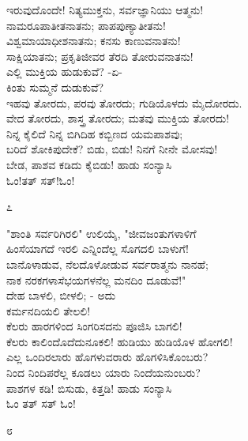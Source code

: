 \begin{myquote}
ಇರುವುದೊಂದೇ! ನಿತ್ಯಮುಕ್ತನು, ಸರ್ವಜ್ಞಾನಿಯು ಆತ್ಮನು!\\ನಾಮರೂಪಾತೀತನಾತನು; ಪಾಪಪುಣ್ಯಾತೀತನು!\\ವಿಶ್ವಮಾಯಾಧೀಶನಾತನು; ಕನಸು ಕಾಣುವನಾತನು!\\ಸಾಕ್ಷಿಯಾತನು; ಪ್ರಕೃತಿಜೀವರ ತೆರದಿ ತೋರುವನಾತನು!\\ಎಲ್ಲಿ ಮುಕ್ತಿಯ ಹುಡುಕುವೆ? -ಏ-\\ಕಿಂತು ಸುಮ್ಮನೆ ದುಡುಕುವೆ?\\ಇಹವು ತೋರದು, ಪರವು ತೋರದು; ಗುಡಿಯೊಳದು ಮೈದೋರದು.\\ವೇದ ತೋರದು, ಶಾಸ್ತ್ರ ತೋರದು; ಮತವು ಮುಕ್ತಿಯ ತೋರದು!\\ನಿನ್ನ ಕೈಲಿದೆ ನಿನ್ನ ಬಿಗಿದಿಹ ಕಬ್ಬಿಣದ ಯಮಪಾಶವು;\\ಬರಿದೆ ಶೋಕಿಪುದೇಕೆ? ಬಿಡು, ಬಿಡು! ನಿನಗೆ ನೀನೇ ಮೋಸವು!\\ಬೇಡ, ಪಾಶವ ಕಡಿದು ಕೈಬಿಡು! ಹಾಡು ಸಂನ್ಯಾಸಿ\\ಓಂ!ತತ್ ಸತ್!ಓಂ!
\end{myquote}

\begin{center}
೭
\end{center}

\begin{myquote}
"ಶಾಂತಿ ಸರ್ವರಿಗಿರಲಿ" ಉಲಿಯೈ, "ಜೀವಜಂತುಗಳಾಳಿಗೆ\\ಹಿಂಸೆಯಾಗದೆ ಇರಲಿ ಎನ್ನಿಂದೆಲ್ಲ ಸೊಗದಲಿ ಬಾಳುಗೆ!\\ಬಾನೊಳಾಡುವ, ನೆಲದೊಳೋಡುವ ಸರ್ವರಾತ್ಮನು ನಾನಹೆ;\\ನಾಕ ನರಕಗಳಾಸೆಭಯಗಳನೆಲ್ಲ ಮನದಿಂ ದೂಡುವೆ!"\\ದೇಹ ಬಾಳಲಿ, ಬೀಳಲಿ; - ಅದು\\ಕರ್ಮನದಿಯಲಿ ತೇಲಲಿ!\\ಕೆಲರು ಹಾರಗಳಿಂದ ಸಿಂಗರಿಸದನು ಪೂಜಿಸಿ ಬಾಗಲಿ!\\ಕೆಲರು ಕಾಲಿಂದೊದೆದುನೂಕಲಿ! ಹುಡಿಯು ಹುಡಿಯೊಳ ಹೋಗಲಿ!\\ಎಲ್ಲ ಒಂದಿರಲಾರು ಹೊಗಳುವರಾರು ಹೊಗಳಿಸಿಕೊಂಬರು?\\ನಿಂದ ನಿಂದಿಪರೆಲ್ಲ ಕೂಡಲು ಯಾರು ನಿಂದೆಯನುಂಬರು?\\ಪಾಶಗಳ ಕಡಿ! ಬಿಸುಡು, ಕಿತ್ತಡಿ! ಹಾಡು ಸಂನ್ಯಾಸಿ\\ಓಂ ತತ್ ಸತ್ ಓಂ!
\end{myquote}

\begin{center}
೮
\end{center}

